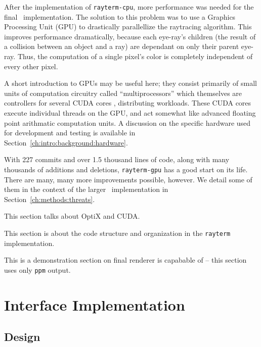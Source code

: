 After the implementation of \texttt{rayterm-cpu}, more performance was needed for the final \name\ implementation.
The solution to this problem was to use a Graphics Processing Unit (GPU) to drastically parallellize the raytracing algorithm.
This improves performance dramatically, because each eye-ray's children (the result of a collision between an object and a ray) are dependant on only their parent eye-ray.
Thus, the computation of a single pixel's color is completely independent of every other pixel.

A short introduction to GPUs may be useful here; they consist primarily of small units of computation circuitry called ``multiprocessors'' which themselves are controllers for several CUDA cores \cite{fermi2009nvidia}, distributing workloads.
These CUDA cores execute individual threads on the GPU, and act somewhat like advanced floating point arithmatic computation units.
A discussion on the specific hardware used for development and testing is available in Section~\ref{ch:intro:background:hardware}.

With 227 commits and over 1.5 thousand lines of code, along with many thousands of additions and deletions, \texttt{rayterm-gpu} has a good start on its life.
There are many, many more improvements possible, however.
We detail some of them in the context of the larger \name\ implementation in Section~\ref{ch:methods:threats}.

 \label{ch:methods:renderer:parallel:libraries}

This section talks about OptiX and CUDA.

 \label{ch:methods:renderer:parallel:design}

This section is about the code structure and organization in the \texttt{rayterm} implementation.

 \label{ch:methods:renderer:parallel:demo}

This is a demonstration section on final renderer is capabable of -- this section uses only \texttt{ppm} output.

\section{Interface Implementation} \label{ch:methods:interface}

\subsection{Design} \label{ch:methods:interface:design}
